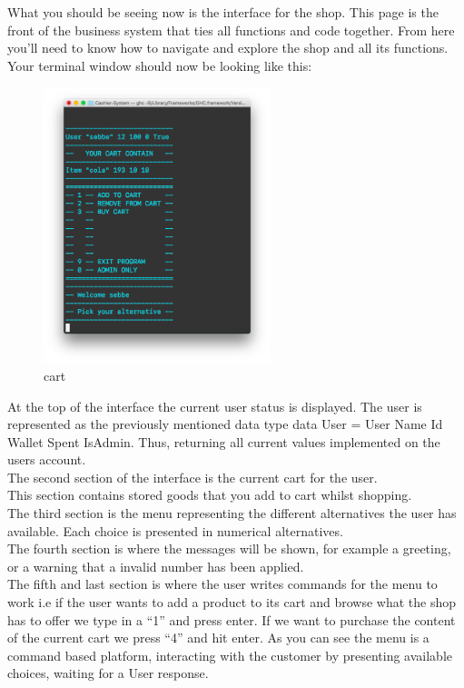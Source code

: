 \documentclass[11pt]{article}
\begin{document}
What you should be seeing now is the interface for the shop. This page is the front of the business system that ties all functions and code together. From here you’ll need to know how to navigate and explore the shop and all its functions. Your terminal window should now be looking like this:
\\
\begin{figure}[h]
  \includegraphics[width= 250px]{interface2.png}
  \caption{cart}
\end{figure}
\newpage
At the top of the interface the current user status is displayed. The user is represented as the previously mentioned data type data User = User Name Id Wallet Spent IsAdmin.
Thus, returning all current values implemented on the users account.\\
The second section of the interface is the current cart for the user.\\
This section contains stored goods that you add to cart whilst shopping.\\
The third section is the menu representing the different alternatives the user has available. Each choice is presented in numerical alternatives.\\
The fourth section is where the messages will be shown, for example a greeting, or a warning that a invalid number has been applied.\\
The fifth and last section is where the user writes commands for the menu to work i.e if the user wants to add a product to its cart and browse what the shop has to offer we type in a “1” and press enter. If we want to purchase the content of the current cart we press “4” and hit enter. As you can see the menu is a command based platform, interacting with the customer by presenting available choices, waiting for a User response.\\\\
\end{document}
